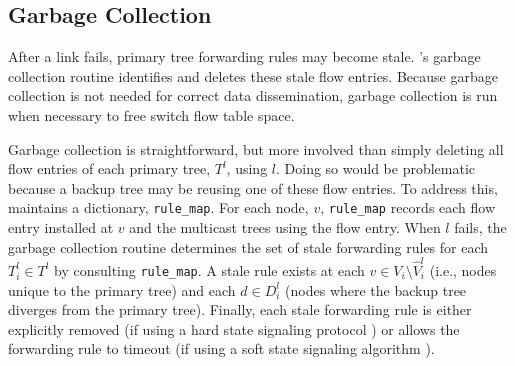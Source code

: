\subsection{Garbage Collection}
\label{subsec:garbage}

After a link fails, primary tree forwarding rules may become stale. \mdrs's garbage collection routine identifies and deletes these stale flow entries. 
Because garbage collection is not needed for correct data dissemination, garbage collection is run when necessary to free switch flow table space. 

Garbage collection is straightforward, but more involved than simply deleting all flow entries of each primary tree, $T^l$, using $l$.  Doing so would be problematic 
because a backup tree may be reusing one of these flow entries.  To address this, \mdr maintains a dictionary, {\tt rule\_map}.  For each node, $v$, {\tt rule\_map} records
each flow entry installed at $v$ and the multicast trees using the flow entry. %
When $l$ fails, the garbage collection routine determines the set of stale forwarding rules for each $T^l_i \in T^l$ by consulting  {\tt rule\_map}.
A stale rule exists at each $v \in V_i \setminus \hat{V}_i^l$ (i.e., nodes unique to the primary tree) and each $d \in D_i^l$ (nodes where the backup tree diverges from the primary tree).
Finally, each stale forwarding rule is either explicitly removed (if using a hard state signaling protocol \cite{Ji03}) 
or \mdr allows the forwarding rule to timeout (if using a soft state signaling algorithm \cite{Clark88}).



